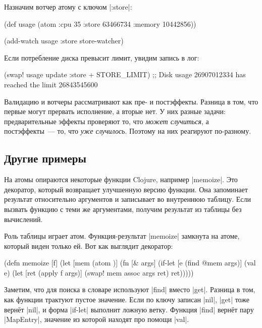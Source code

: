 Назначим вотчер атому с ключом \spverb|:store|:

\begin{english}
  \begin{clojure}
(def usage
  (atom {:cpu 35
         :store 63466734
         :memory 10442856}))

(add-watch usage :store store-watcher)
  \end{clojure}
\end{english}

\noindent
Если потребление диска превысит лимит, увидим запись в лог:

\begin{english}
  \begin{clojure}
(swap! usage update :store + STORE_LIMIT)
;; Disk usage 26907012334 has reached the limit 26843545600
  \end{clojure}
\end{english}

Валидацию и вотчеры рассматривают как пре- и постэффекты. Разница в том, что
первые могут прервать исполнение, а вторые нет. У них разные задачи:
предварительные эффекты проверяют то, что \emph{может случиться}, а
постэффекты~--- то, что \emph{уже случилось}. Поэтому на них реагируют
по-разному.

\subsection{Другие примеры}

На атомы опираются некоторые функции Clojure, например \spverb|memoize|. Это
декоратор, который возвращает улучшенную версию функции. Она запоминает
результат относительно аргументов и записывает во внутреннюю таблицу. Если
вызвать функцию с теми же аргументами, получим результат из таблицы без
вычислений.

Роль таблицы играет атом. Функция-результат \spverb|memoize| замкнута на атоме,
который виден только ей. Вот как выглядит декоратор:

\begin{english}
  \begin{clojure}
(defn memoize [f]
  (let [mem (atom {})]
    (fn [& args]
      (if-let [e (find @mem args)]
        (val e)
        (let [ret (apply f args)]
          (swap! mem assoc args ret)
          ret)))))
  \end{clojure}
\end{english}

Заметим, что для поиска в словаре используют \spverb|find| вместо
\spverb|get|. Разница в том, как функции трактуют пустое значение. Если по ключу
записан \spverb|nil|, \spverb|get| тоже верн\"{е}т \spverb|nil|, и форма
\spverb|if-let| выполнит ложную ветку. Функция \spverb|find| верн\"{е}т пару
\spverb|MapEntry|, значение из которой находят про помощи \spverb|val|.

